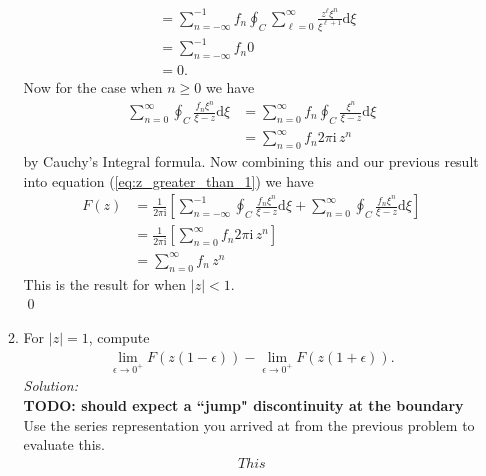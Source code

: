 \documentclass[10pt]{amsart}
\newcommand{\D}{\mathrm{d}}
\newcommand{\I}{\mathrm{i}}
\theoremstyle{nonumberplain}
\begin{document}
\begin{enumerate}[label={\bf {\arabic*}:}]
\begin{enumerate}
\begin{align*}
	&= \sum_{n = -\infty}^{-1} f_n \oint_{C} \sum_{\ell = 0}^\infty \frac {z^\ell \xi^n}{\xi^{\ell + 1}} \D \xi \\
	&= \sum_{n = -\infty}^{-1} f_n 0 \\
	&= 0.
\end{align*}
Now for the case when $n \geq 0$ we have
\begin{align*}
\sum_{n = 0}^\infty \oint_{C} \frac{ f_n \xi^n }{\xi - z} \D \xi
	&= \sum_{n = 0}^\infty f_n \oint_{C} \frac{ \xi^n }{\xi - z} \D \xi \\
	&= \sum_{n = 0}^\infty f_n 2 \pi \I \, z^n
\end{align*}
by Cauchy's Integral formula.
Now combining this and our previous result into equation (\ref{eq:z_greater_than_1}) we have
\begin{align*}
F(z) &= \frac{1}{2 \pi \I} \left[
		\sum_{n = -\infty}^{-1} \oint_{C} \frac{ f_n \xi^n }{\xi - z} \D \xi
		+ \sum_{n = 0}^\infty \oint_{C} \frac{ f_n \xi^n }{\xi - z} \D \xi
	\right] \\
	&= \frac{1}{2 \pi \I} \left[ \sum_{n = 0}^\infty f_n 2 \pi \I \, z^n \right] \\
	&= \sum_{n = 0}^\infty f_n \, z^n
\end{align*}
This is the result for when $|z| < 1$. \\
\qed \\

\item For $|z| = 1$, compute
\begin{align*}
\lim_{\epsilon \to 0^+} F( z(1 - \epsilon)) -       \lim_{\epsilon \to 0^+} F( z(1 + \epsilon)) .
\end{align*}
\textit{Solution:} \\
\textbf{TODO: should expect a ``jump" discontinuity at the boundary}
Use the series representation you arrived at from the previous problem to evaluate this.
\begin{align*}
This
\end{align*}

\end{enumerate}
\end{enumerate}
\end{document}
